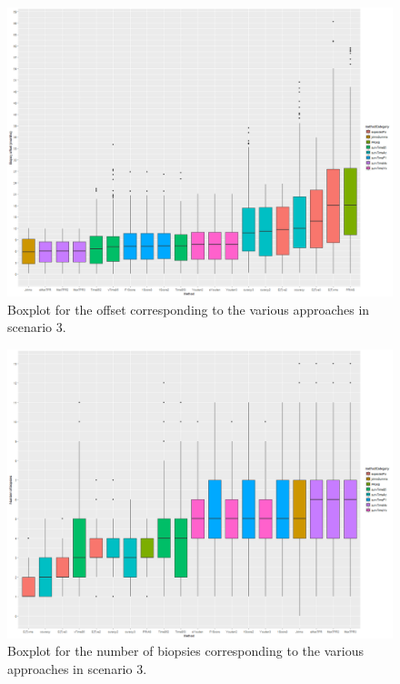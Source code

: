 \begin{figure}[H]
\centering
\captionsetup{justification=centering}
\includegraphics[width=\textwidth]{sim_study_res_sc_8pt5_sh_3/offset_boxplot.png}
\caption{\label{fig : sc_8pt5_sh_3_offset_boxplot} Boxplot for the offset corresponding to the various approaches in scenario 3.}
\end{figure}

\begin{figure}[H]
\centering
\captionsetup{justification=centering}
\includegraphics[width=\textwidth]{sim_study_res_sc_8pt5_sh_3/nb_boxplot.png}
\caption{\label{fig : sc_8pt5_sh_3_nb_boxplot} Boxplot for the number of biopsies corresponding to the various approaches in scenario 3.}
\end{figure}